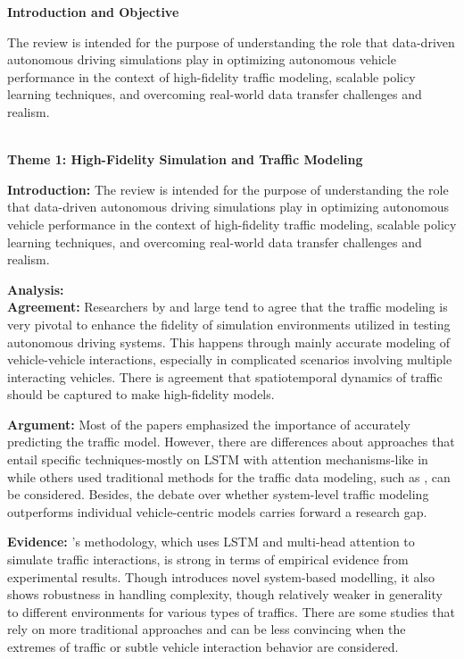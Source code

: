 \documentclass[lettersize,journal]{IEEEtran}
\newcommand{\subsubsubsection}[1]{%
    \par\medskip
    \noindent\textbf{#1}
    \par\medskip
}
\begin{document}
\subsubsubsection{Introduction and Objective}
The review is intended for the purpose of understanding the role that data-driven autonomous driving simulations play in optimizing autonomous vehicle performance in the context of high-fidelity traffic modeling, scalable policy learning techniques, and overcoming real-world data transfer challenges and realism.
\\
\\
\subsubsubsection{Theme 1: High-Fidelity Simulation and Traffic Modeling}
\textbf{Introduction:}
The review is intended for the purpose of understanding the role that data-driven autonomous driving simulations play in optimizing autonomous vehicle performance in the context of high-fidelity traffic modeling, scalable policy learning techniques, and overcoming real-world data transfer challenges and realism.

\textbf{Analysis:}  \\
\textbf{Agreement:}
Researchers by and large tend to agree that the traffic modeling is very pivotal to enhance the fidelity of simulation environments utilized in testing autonomous driving systems. This happens through mainly accurate modeling of vehicle-vehicle interactions, especially in complicated scenarios involving multiple interacting vehicles. There is agreement that spatiotemporal dynamics of traffic should be captured to make high-fidelity models.

\textbf{Argument:}
Most of the papers emphasized the importance of accurately predicting the traffic model. However, there are differences about approaches that entail specific techniques-mostly on LSTM with attention mechanisms-like in \cite{ref2} while others used traditional methods for the traffic data modeling, such as \cite{ref2},\cite{ref9} can be considered. Besides, the debate over whether system-level traffic modeling \cite{ref2} outperforms individual vehicle-centric models carries forward a research gap.

\textbf{Evidence:}
\cite{ref2}'s methodology, which uses LSTM and multi-head attention to simulate traffic interactions, is strong in terms of empirical evidence from experimental results. Though \cite{ref2} introduces novel system-based modelling, it also shows robustness in handling complexity, though relatively weaker in generality to different environments for various types of traffics. There are some studies that rely on more traditional approaches and can be less convincing when the extremes of traffic or subtle vehicle interaction behavior are considered.
\end{document}
